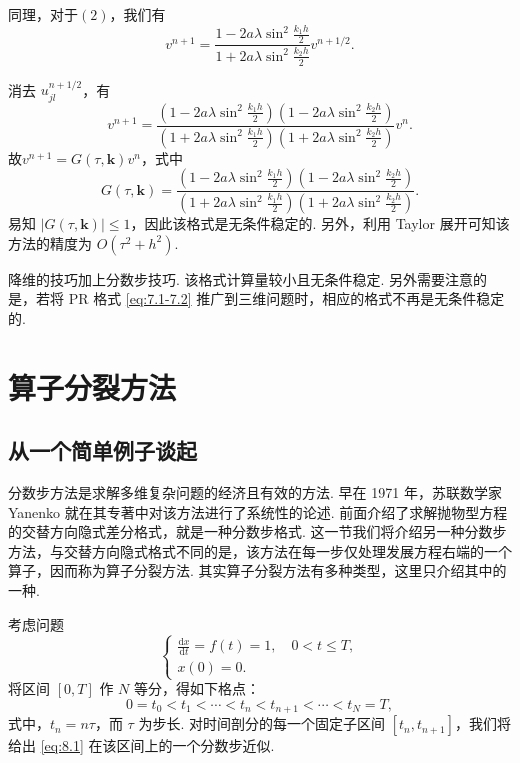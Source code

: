 同理，对于$(2)$，我们有
\begin{equation*}
    v^{n+1}=\frac{1-2a\lambda\sin^2\frac{k_1h}{2}}{1+2a\lambda\sin^2\frac{k_2h}{2}}v^{n+1/2}.
\end{equation*}

消去 $u_{jl}^{n+1/2}$，有
\begin{equation*}
    v^{n+1}=\frac{(1-2a\lambda\sin^2\frac{k_1h}{2})(1-2a\lambda\sin^2\frac{k_2h}{2})}{(1+2a\lambda\sin^2\frac{k_1h}{2})(1+2a\lambda\sin^2\frac{k_2h}{2})}v^n.
\end{equation*}
故$v^{n+1} = G(\tau, \boldsymbol{k})v^n$，式中
\begin{equation*}
    G(\tau, \boldsymbol{k}) = \frac{(1 - 2a\lambda\sin^2\frac{k_1h}{2})(1 - 2a\lambda\sin^2\frac{k_2h}{2})}{(1 + 2a\lambda\sin^2\frac{k_1h}{2})(1 + 2a\lambda\sin^2\frac{k_2h}{2})}.
\end{equation*}
易知 $|G(\tau, \boldsymbol{k})| \leq 1$，因此该格式是无条件稳定的. 另外，利用 Taylor 展开可知该方法的精度为 $O(\tau^2 + h^2)$.

\begin{remark}[小节]
降维的技巧加上分数步技巧. 该格式计算量较小且无条件稳定. 另外需要注意的是，若将 PR 格式 \eqref{eq:7.1-7.2} 推广到三维问题时，相应的格式不再是无条件稳定的.
\end{remark}

\section{算子分裂方法}

\subsection{从一个简单例子谈起}

\begin{note}[历史回顾]
分数步方法是求解多维复杂问题的经济且有效的方法. 早在 1971 年，苏联数学家 Yanenko 就在其专著中对该方法进行了系统性的论述. 前面介绍了求解抛物型方程的交替方向隐式差分格式，就是一种分数步格式. 这一节我们将介绍另一种分数步方法，与交替方向隐式格式不同的是，该方法在每一步仅处理发展方程右端的一个算子，因而称为算子分裂方法. 其实算子分裂方法有多种类型，这里只介绍其中的一种.
\end{note}

考虑问题
\begin{equation}\label{eq:8.1}
    \begin{cases}
        \frac{\mathrm{d}x}{\mathrm{d}t} = f(t) = 1, \quad 0 < t \leq T, \\
        x(0) = 0.
    \end{cases}
\end{equation}
将区间 $[0, T]$ 作 $N$ 等分，得如下格点：
\begin{equation*}
    0 = t_0 < t_1 < \cdots < t_n < t_{n+1} < \cdots < t_N = T,
\end{equation*}
式中，$t_n = n\tau$，而 $\tau$ 为步长. 对时间剖分的每一个固定子区间 $[t_n, t_{n+1}]$，我们将给出 \eqref{eq:8.1} 在该区间上的一个分数步近似.


